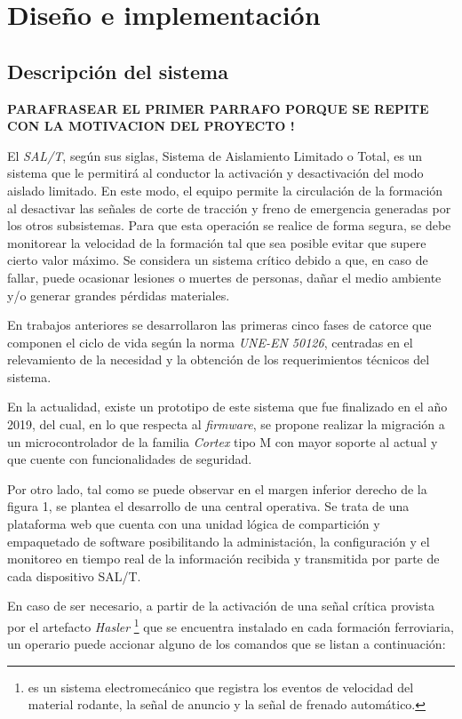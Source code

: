 \chapter{Diseño e implementación} %

\label{Chapter3} %


\section{Descripción del sistema}


\textbf{PARAFRASEAR EL PRIMER PARRAFO PORQUE SE REPITE CON LA MOTIVACION DEL PROYECTO !}

El \textit{SAL/T}, según sus siglas, Sistema de Aislamiento Limitado o Total, es un sistema que le permitirá al conductor la activación y desactivación del modo aislado limitado. En este modo, el equipo permite la circulación de la formación al desactivar las señales de corte de tracción y freno de emergencia generadas por los otros subsistemas. Para que esta operación se realice de forma segura, se debe monitorear la velocidad de la formación tal que sea posible evitar que supere cierto valor máximo. 
Se considera un sistema crítico debido a que, en caso de fallar, puede ocasionar lesiones o muertes de personas, dañar el medio ambiente y/o generar grandes pérdidas materiales.

En trabajos anteriores se desarrollaron las primeras cinco fases de catorce que componen el ciclo de vida según la norma \textit{UNE-EN 50126}, centradas en el relevamiento de la necesidad y la obtención de los requerimientos técnicos del sistema.

En la actualidad, existe un prototipo de este sistema que fue finalizado en el año 2019, del cual, en lo que respecta al \textit{firmware}, se propone realizar la migración a un microcontrolador de la familia \textit{Cortex} tipo M con mayor soporte al actual y que cuente con funcionalidades de seguridad.  

Por otro lado, tal como se puede observar en el margen inferior derecho de la figura 1, se plantea el desarrollo de una central operativa. Se trata de una plataforma web que cuenta con una unidad lógica de compartición y empaquetado de software posibilitando la administación, la configuración y el monitoreo en tiempo real de la información recibida y transmitida por parte de cada dispositivo SAL/T. 


\newpage
En caso de ser necesario, a partir de la activación de una señal crítica provista por el artefacto \textit{Hasler} \footnote{ es un sistema electromecánico que registra los eventos de velocidad del material rodante, la señal de anuncio y la señal de frenado automático.
}  que se encuentra instalado en cada formación ferroviaria, un operario puede accionar alguno de los comandos que se listan a continuación:


